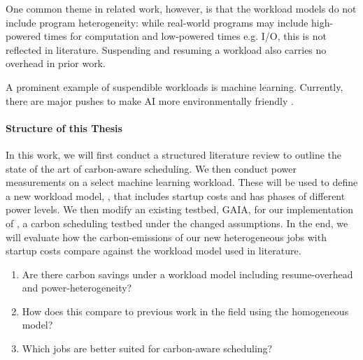 One common theme in related work, however, is that the workload models do not include program heterogeneity: while real-world programs may include high-powered times for computation and low-powered times e.g. I/O, this is not reflected in literature. 
Suspending and resuming a workload also carries no overhead in prior work. 

A prominent example of suspendible workloads is machine learning. Currently, there are major pushes to make AI more environmentally friendly \cite{schwartz_green_2019}. 

\paragraph{Structure of this Thesis}

In this work, we will first conduct a structured literature review to outline the state of the art of carbon-aware scheduling. 
We then conduct power measurements on a select machine learning workload.
These will be used to define a new workload model, \modelname{}, that includes startup costs and has phases of different power levels. 
We then modify an existing testbed, GAIA, for our implementation of \programname{}, a carbon scheduling testbed under the changed assumptions.
In the end, we will evaluate how the carbon-emissions of our new heterogeneous jobs with startup costs compare against the workload model used in literature.

\begin{enumerate}
    \item Are there carbon savings under a workload model including resume-overhead and power-heterogeneity?
    \item How does this compare to previous work in the field using the homogeneous model?
    \item Which jobs are better suited for carbon-aware scheduling?
\end{enumerate}

